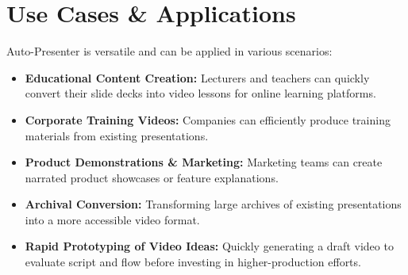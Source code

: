 \documentclass{article}
\begin{document}
%

\section{Use Cases & Applications}
Auto-Presenter is versatile and can be applied in various scenarios:
\begin{itemize}
    \item \textbf{Educational Content Creation:} Lecturers and teachers can quickly convert their slide decks into video lessons for online learning platforms.
    \item \textbf{Corporate Training Videos:} Companies can efficiently produce training materials from existing presentations.
    \item \textbf{Product Demonstrations & Marketing:} Marketing teams can create narrated product showcases or feature explanations.
    \item \textbf{Archival Conversion:} Transforming large archives of existing presentations into a more accessible video format.
    \item \textbf{Rapid Prototyping of Video Ideas:} Quickly generating a draft video to evaluate script and flow before investing in higher-production efforts.
\end{itemize}
\end{document}
